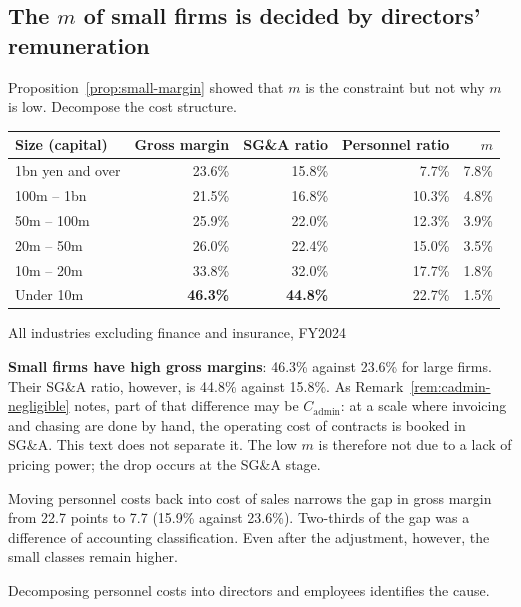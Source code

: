 \subsection{The $m$ of small firms is decided by directors' remuneration}
\label{sec:officer-comp}

Proposition~\ref{prop:small-margin} showed that $m$ is the constraint but not why $m$ is low.
Decompose the cost structure.

\begin{center}
\begin{tabular}{@{}lrrrr@{}}
\toprule
Size (capital) & Gross margin & SG\&A ratio & Personnel ratio & $m$ \\
\midrule
1bn yen and over & 23.6\% & 15.8\% & 7.7\% & 7.8\% \\
100m -- 1bn & 21.5\% & 16.8\% & 10.3\% & 4.8\% \\
50m -- 100m & 25.9\% & 22.0\% & 12.3\% & 3.9\% \\
20m -- 50m & 26.0\% & 22.4\% & 15.0\% & 3.5\% \\
10m -- 20m & 33.8\% & 32.0\% & 17.7\% & 1.8\% \\
Under 10m & \textbf{46.3\%} & \textbf{44.8\%} & 22.7\% & 1.5\% \\
\bottomrule
\end{tabular}
\label{tab:cost-structure-by-size}
\end{center}
\begin{center}\footnotesize All industries excluding finance and insurance, FY2024\end{center}

\textbf{Small firms have high gross margins}: 46.3\% against 23.6\% for large firms. Their
SG\&A ratio, however, is 44.8\% against 15.8\%. As Remark~\ref{rem:cadmin-negligible} notes,
part of that difference may be $C_{\mathrm{admin}}$: at a scale where invoicing and chasing
are done by hand, the operating cost of contracts is booked in SG\&A. This text does not
separate it. The low $m$ is therefore not due to a lack of pricing power; the drop occurs at
the SG\&A stage.

Moving personnel costs back into cost of sales narrows the gap in gross margin from 22.7
points to 7.7 (15.9\% against 23.6\%). Two-thirds of the gap was a difference of accounting
classification. Even after the adjustment, however, the small classes remain higher.

Decomposing personnel costs into directors and employees identifies the cause.


